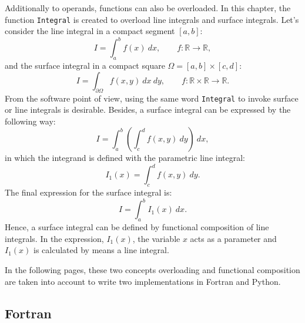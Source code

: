 Additionally to operands, functions can also be overloaded. 
In this chapter, the function \texttt{Integral} is created to overload line integrals 
and surface integrals. 
Let's consider the  line integral in a compact segment $[a, b]$: 
\begin{equation}   
    I =  \int _a ^b f(x) \ dx, \qquad f: \mathbb{R} \rightarrow \mathbb{R},   
\end{equation} 
and the surface integral in a compact square $ \Omega = [a, b] \times [c,d]$:   
\begin{equation}   
    I =  \int _{\partial \Omega} f(x, y) \ dx \ dy, 
    \qquad f: \mathbb{R}\times \mathbb{R} \rightarrow \mathbb{R}.   
\end{equation} 
From the software point of view, using the same word \texttt{Integral}
to invoke surface or line integrals is desirable. 
Besides, a surface integral can be expressed by the following way: 
\begin{equation}   
    I =  \int _{a} ^b \left(   \int _{c} ^d f(x,y) \ dy      \right) \ dx,
\end{equation} 
in which the integrand is defined with the parametric line integral:
\begin{equation}   
   I_1(x) = \int _{c} ^d f(x,y) \ dy.  
   \label{I1}   
\end{equation} 
The final expression for the surface integral is:  
\begin{equation}   
    I =   \int _{a} ^b I_1(x) \ dx. 
    \label{I2D}  
\end{equation} 
Hence, a surface integral can be defined by functional composition of line integrals. 
In the expression,  $ I_1(x) $, the variable $ x $ acts as a parameter
and $ I_1(x) $ is calculated by means a line integral. 
 
In the following pages, these two concepts overloading and functional composition
are taken into account to write two implementations in Fortran and Python. 

 
\newpage  
\subsection*{Fortran}

\renewcommand{\home}{./Fortran/sources/Advanced_programming/overloading} 
\lstfor

